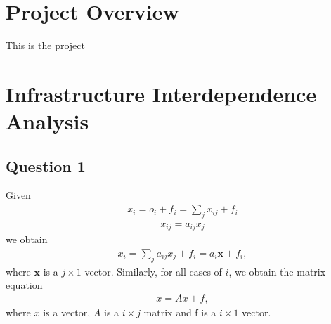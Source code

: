 \documentclass[11pt,a4paper]{article}
\begin{document}
\graphicspath{ {../figures/} }

\maketitle

\section{Project Overview}
This is the project
\section{Infrastructure Interdependence Analysis}

\subsection*{Question 1}
Given
\begin{align}
	x_i = o_i + f_i = \sum_{j} x_{ij} + f_i
\end{align}
\begin{align}
	x_{ij} = a_{ij}x_{j}
\end{align}
we obtain
\begin{align*}
	x_i = \sum_{j} a_{ij}x_{j} + f_i = a_{i}\bm{x} + f_i,
\end{align*}
where $\bm{x}$ is a $j \times 1$ vector. Similarly, for all cases of $i$, we obtain the matrix equation
\begin{align}
	x = Ax + f,
\end{align}
where $x$ is a vector, $A$ is a $i \times j$ matrix and f is a $i \times 1$ vector.
\end{document}
